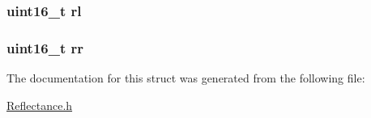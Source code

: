 \subsubsection[{\texorpdfstring{rl}{rl}}]{\setlength{\rightskip}{0pt plus 5cm}uint16\+\_\+t rl}\hypertarget{structsensors___a55f8b53aee5b41e8af88a816fab2b70b}{}\label{structsensors___a55f8b53aee5b41e8af88a816fab2b70b}
\subsubsection[{\texorpdfstring{rr}{rr}}]{\setlength{\rightskip}{0pt plus 5cm}uint16\+\_\+t rr}\hypertarget{structsensors___a6988d1a89f109b3f8d0e06547a5362f6}{}\label{structsensors___a6988d1a89f109b3f8d0e06547a5362f6}


The documentation for this struct was generated from the following file\+:\begin{DoxyCompactItemize}
\item 
\hyperlink{_reflectance_8h}{Reflectance.\+h}\end{DoxyCompactItemize}
